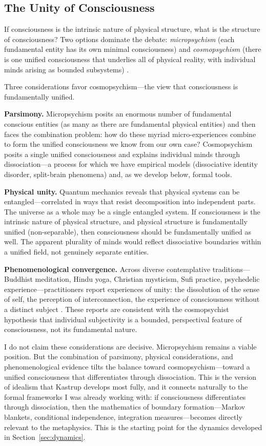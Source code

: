 \documentclass[11pt,a4paper]{article}
\theoremstyle{definition}
\theoremstyle{plain}
\theoremstyle{remark}
\begin{document}
\subsection{The Unity of Consciousness}\label{sec:unity}

If consciousness is the intrinsic nature of physical structure, what is the structure of consciousness? Two options dominate the debate: \textit{micropsychism} (each fundamental entity has its own minimal consciousness) and \textit{cosmopsychism} (there is one unified consciousness that underlies all of physical reality, with individual minds arising as bounded subsystems) \citep{Goff2017,Shani2015}.

Three considerations favor cosmopsychism---the view that consciousness is fundamentally unified.

\textbf{Parsimony.} Micropsychism posits an enormous number of fundamental conscious entities (as many as there are fundamental physical entities) and then faces the combination problem: how do these myriad micro-experiences combine to form the unified consciousness we know from our own case? Cosmopsychism posits a single unified consciousness and explains individual minds through dissociation---a process for which we have empirical models (dissociative identity disorder, split-brain phenomena) and, as we develop below, formal tools.

\textbf{Physical unity.} Quantum mechanics reveals that physical systems can be entangled---correlated in ways that resist decomposition into independent parts. The universe as a whole may be a single entangled system. If consciousness is the intrinsic nature of physical structure, and physical structure is fundamentally unified (non-separable), then consciousness should be fundamentally unified as well. The apparent plurality of minds would reflect dissociative boundaries within a unified field, not genuinely separate entities.

\textbf{Phenomenological convergence.} Across diverse contemplative traditions---Buddhist meditation, Hindu yoga, Christian mysticism, Sufi practice, psychedelic experience---practitioners report experiences of unity: the dissolution of the sense of self, the perception of interconnection, the experience of consciousness without a distinct subject \citep{Milliere2018}. These reports are consistent with the cosmopsychist hypothesis that individual subjectivity is a bounded, perspectival feature of consciousness, not its fundamental nature.

I do not claim these considerations are decisive. Micropsychism remains a viable position. But the combination of parsimony, physical considerations, and phenomenological evidence tilts the balance toward cosmopsychism---toward a unified consciousness that differentiates through dissociation. This is the version of idealism that Kastrup develops most fully, and it connects naturally to the formal frameworks I was already working with: if consciousness differentiates through dissociation, then the mathematics of boundary formation---Markov blankets, conditional independence, integration measures---becomes directly relevant to the metaphysics. This is the starting point for the dynamics developed in Section~\ref{sec:dynamics}.
\end{document}
